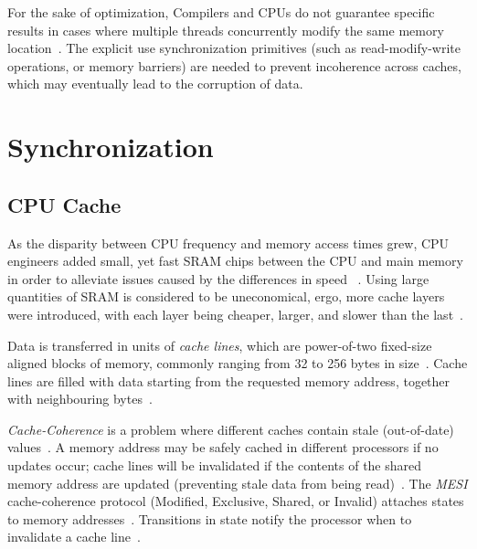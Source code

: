 For the sake of optimization, Compilers and CPUs do not guarantee specific
results in cases where multiple threads concurrently modify the same memory
location~\citep{drepper2007every}. The explicit use synchronization primitives
(such as read-modify-write operations, or memory barriers) are needed to
prevent incoherence across caches, which may eventually lead to the corruption
of data.

\pagebreak

\section{Synchronization}
\subsection{CPU Cache}
As the disparity between CPU frequency and memory access times grew, 
CPU engineers added small, yet fast SRAM chips between the CPU
and main memory in order to alleviate issues caused by the differences in speed
~\citep{cantrill2008real,drepper2007every,perfbook2021}. Using large
quantities of SRAM is considered to be uneconomical, ergo, more cache layers
were introduced, with each layer being cheaper, larger, and slower than the
last~\citep{drepper2007every,perfbook2021}.

Data is transferred in units of \emph{cache lines}, which are power-of-two
fixed-size aligned blocks of memory, commonly ranging from 32 to 256 bytes in
size~\citep[Section~3.2.1]{perfbook2021}. Cache lines are filled with data
starting from the requested memory address, together with neighbouring bytes~\citep[Section~3.2.1]{perfbook2021}.


\emph{Cache-Coherence} is a problem where different caches contain stale
(out-of-date) values~\citep[Appendix~B.5.1]{herlihy2020art}. A memory address
may be safely cached in different processors if no updates occur; 
cache lines will be invalidated if the contents of the shared memory address are
updated (preventing stale data from being
read)~\citep[Appendix~B.5.1]{herlihy2020art}.
The \emph{MESI} cache-coherence protocol (Modified, Exclusive, Shared, or
Invalid) attaches states to memory
addresses~\citep[Appendix~B.5.1]{herlihy2020art}. Transitions in state notify
the processor when to invalidate a cache
line~\citep[Appendix~B.5.1]{herlihy2020art}.

